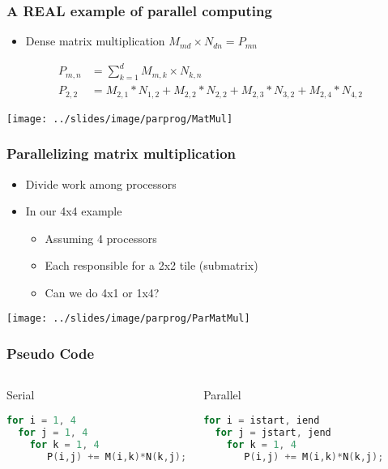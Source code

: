 \documentclass[10pt,t]{beamer}
\begin{document}
\begin{frame}
  \frametitle{A REAL example of parallel computing}
  \begin{itemize}
  \item Dense matrix multiplication $M_{md}\times{}N_{dn}=P_{mn}$
  \end{itemize}
  \begin{align*}
    P_{m,n} &= \sum_{k=1}^{d}M_{m,k}\times{}N_{k,n}\\
    P_{2,2} &= M_{2,1}*N_{1,2}+M_{2,2}*N_{2,2}+M_{2,3}*N_{3,2}+M_{2,4}*N_{4,2}
  \end{align*}
  \begin{center}
    \texttt{[image: ../slides/image/parprog/MatMul]}
  \end{center}
\end{frame}

\begin{frame}
  \frametitle{Parallelizing matrix multiplication}
  \begin{itemize}
  \item Divide work among processors
  \item In our 4x4 example
    \begin{itemize}
    \item Assuming 4 processors
    \item Each responsible for a 2x2 tile (submatrix)
    \item Can we do 4x1 or 1x4?
    \end{itemize}
  \end{itemize}
  \begin{center}
    \texttt{[image: ../slides/image/parprog/ParMatMul]}
  \end{center}
\end{frame}

\begin{frame}[fragile]
  \frametitle{Pseudo Code}
  \begin{columns}
    \begin{exampleblock}{Serial}
      \begin{lstlisting}[language=C]
for i = 1, 4
  for j = 1, 4
    for k = 1, 4
       P(i,j) += M(i,k)*N(k,j);
      \end{lstlisting}
    \end{exampleblock}
    \begin{exampleblock}{Parallel}
      \begin{lstlisting}[language=C]
for i = istart, iend
  for j = jstart, jend
    for k = 1, 4
       P(i,j) += M(i,k)*N(k,j);
      \end{lstlisting}
    \end{exampleblock}
  \end{columns}
\end{frame}
\end{document}
